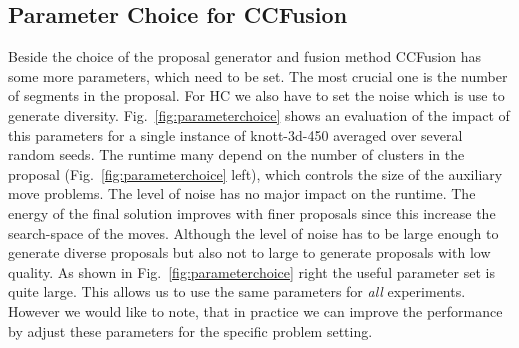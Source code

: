 \documentclass[10pt,twocolumn,letterpaper]{article}
\theoremstyle{definition}
\begin{document}
\subsection{Parameter Choice for CCFusion}
Beside the choice of the proposal generator and fusion method CCFusion has some more parameters, which need to be set.
The most crucial one is the number of segments in the proposal. For HC we also have to set the noise which is use to generate diversity.
Fig.~\ref{fig:parameterchoice} shows an evaluation of the impact of this parameters for a single instance of knott-3d-450 averaged over several random seeds.
The runtime many depend on the number of clusters in the proposal (Fig.~\ref{fig:parameterchoice} left), which controls the size of the auxiliary move problems.
The level of noise has no major impact on the runtime.
The energy of the final solution improves with finer proposals since this increase the search-space of the moves.
Although the level of noise has to be large enough to generate diverse proposals but also not to large to generate proposals with low quality.
As shown in Fig.~\ref{fig:parameterchoice} right the useful parameter set is quite large. This allows us to use the same parameters for \emph{all}
experiments. However we would like to note, that in practice we can improve the performance by adjust these parameters for the specific problem setting.
%
%
\end{document}
